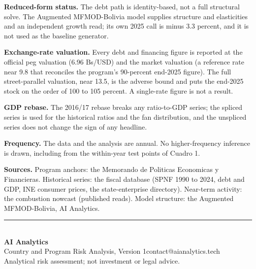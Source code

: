 \documentclass[10pt]{article}
\begin{document}
\textbf{Reduced-form status.} The debt path is identity-based, not a full structural solve. The
Augmented MFMOD-Bolivia model supplies structure and elasticities and an independent growth read; its
own 2025 call is minus 3.3 percent, and it is not used as the baseline generator.

\textbf{Exchange-rate valuation.} Every debt and financing figure is reported at the official peg
valuation (6.96 Bs/USD) and the market valuation (a reference rate near 9.8 that reconciles the
program's 90-percent end-2025 figure). The full street-parallel valuation, near 13.5, is the adverse
bound and puts the end-2025 stock on the order of 100 to 105 percent. A single-rate figure is not a
result.

\textbf{GDP rebase.} The 2016/17 rebase breaks any ratio-to-GDP series; the spliced series is used for
the historical ratios and the fan distribution, and the unspliced series does not change the sign of
any headline.

\textbf{Frequency.} The data and the analysis are annual. No higher-frequency inference is drawn,
including from the within-year test points of Cuadro 1.

\textbf{Sources.} Program anchors: the Memorando de Politicas Economicas y Financieras. Historical
series: the fiscal database (SPNF 1990 to 2024, debt and GDP, INE consumer prices, the state-enterprise
directory). Near-term activity: the combustion nowcast (published reads). Model structure: the
Augmented MFMOD-Bolivia, AI Analytics.

\vspace{16pt}
\noindent\textcolor{slate}{\rule{\textwidth}{0.8pt}}\\[4pt]
{\sffamily\bfseries\color{slate}AI Analytics}\\[1pt]
{\sffamily\footnotesize Country and Program Risk Analysis, Version 1\quad\textbar\quad contact@aianalytics.tech}\\[1pt]
{\sffamily\scriptsize\color{midgrey}Analytical risk assessment; not investment or legal advice.}
\end{document}
